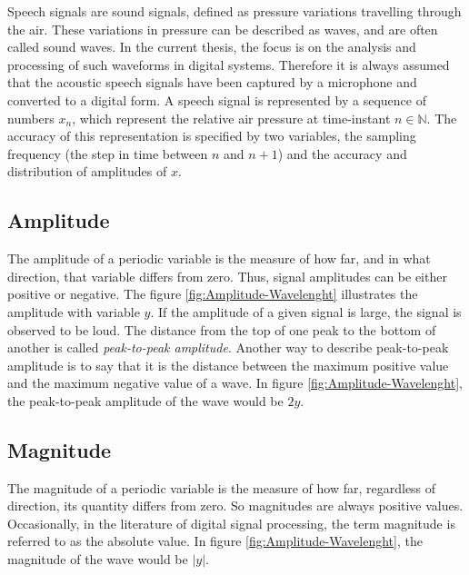 Speech signals are sound signals, defined as pressure variations travelling through the air. These variations in pressure can be described as waves, and are often called sound waves. In the current thesis, the focus is on the analysis and processing of such waveforms in digital systems. Therefore it is always assumed that the acoustic speech signals have been captured by a microphone and converted to a digital form.
\newline
\newline
A speech signal is represented by a sequence of numbers $x_n$, which represent the relative air pressure at time-instant $n\in{\mathbb N}$. The accuracy of this representation is specified by two variables, the sampling frequency (the step in time between $n$ and $n+1$) and the accuracy and distribution of amplitudes of $x$.

\subsection{Amplitude}
\label{sub:Amplitude}

The amplitude of a periodic variable is the measure of how far, and in what direction, that variable differs from zero. Thus, signal amplitudes can be either positive or negative. The figure \ref{fig:Amplitude-Wavelenght} illustrates the amplitude with variable $y$. If the amplitude of a given signal is large, the signal is observed to be loud.
\newline
\newline
The distance from the top of one peak to the bottom of another is called \textit{peak-to-peak amplitude}. Another way to describe peak-to-peak amplitude is to say that it is the distance between the maximum positive value and the maximum negative value of a wave. In figure \ref{fig:Amplitude-Wavelenght}, the peak-to-peak amplitude of the wave would be $2y$.

\subsection{Magnitude}
\label{sub:Magnitude}

The magnitude of a periodic variable is the measure of how far, regardless of direction, its quantity differs from zero. So magnitudes are always positive values. Occasionally, in the literature of digital signal processing, the term magnitude is referred to as the absolute value. In figure \ref{fig:Amplitude-Wavelenght}, the magnitude of the wave would be $|y|$.

